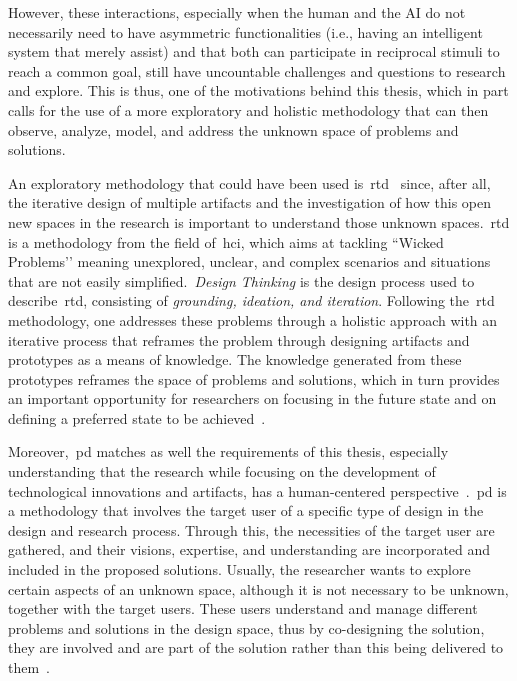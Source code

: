 However, these interactions, especially when the human and the AI do not necessarily need to have asymmetric functionalities (i.e., having an intelligent system that merely assist) and that both can participate in reciprocal stimuli to reach a common goal, still have uncountable challenges and questions to research and explore. This is thus, one of the motivations behind this thesis, which in part calls for the use of a more exploratory and holistic methodology that can then observe, analyze, model, and address the unknown space of problems and solutions.

An exploratory methodology that could have been used is~\acrfull{rtd}~\cite{rtd-zimmerman2007} since, after all, the iterative design of multiple artifacts and the investigation of how this open new spaces in the research is important to understand those unknown spaces.~\acrshort{rtd} is a methodology from the field of~\acrshort{hci}, which aims at tackling ``Wicked Problems’’ meaning unexplored, unclear, and complex scenarios and situations that are not easily simplified.~\emph{Design Thinking} is the design process used to describe~\acrshort{rtd}, consisting of \emph{grounding, ideation, and iteration}. Following the~\acrshort{rtd} methodology, one addresses these problems through a holistic approach with an iterative process that reframes the problem through designing artifacts and prototypes as a means of knowledge. The knowledge generated from these prototypes reframes the space of problems and solutions, which in turn provides an important opportunity for researchers on focusing in the future state and on defining a preferred state to be achieved~\cite{rtd-critique-zimmerman2010}. 

Moreover,~\acrfull{pd} matches as well the requirements of this thesis, especially understanding that the research while focusing on the development of technological innovations and artifacts, has a human-centered perspective~\cite{ParticipatoryDesign-Spinuzzi2005}.~\acrshort{pd} is a methodology that involves the target user of a specific type of design in the design and research process. Through this, the necessities of the target user are gathered, and their visions, expertise, and understanding are incorporated and included in the proposed solutions. Usually, the researcher wants to explore certain aspects of an unknown space, although it is not necessary to be unknown, together with the target users. These users understand and manage different problems and solutions in the design space, thus by co-designing the solution, they are involved and are part of the solution rather than this being delivered to them~\cite{ParticipatoryDesign-Spinuzzi2005}. 

